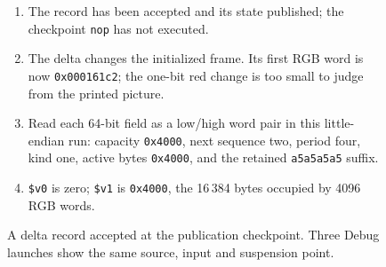 \begin{figure}[htbp]
  \par\smallskip
  \begin{minipage}{\linewidth}
    \small
    \begin{enumerate}
      \item The record has been accepted and its state published; the checkpoint \texttt{nop} has not executed.
      \item The delta changes the initialized frame. Its first RGB word is now \texttt{0x000161c2}; the one-bit red change is too small to judge from the printed picture.
      \item Read each 64-bit field as a low/high word pair in this little-endian run: capacity \texttt{0x4000}, next sequence two, period four, kind one, active bytes \texttt{0x4000}, and the retained \texttt{a5a5a5a5} suffix.
      \item \texttt{\$v0} is zero; \texttt{\$v1} is \texttt{0x4000}, the 16\,384 bytes occupied by 4096 RGB words.
    \end{enumerate}
  \end{minipage}
  \caption{A delta record accepted at the publication checkpoint. Three Debug launches show the same source, input and suspension point.}
  \label{fig:video-record-publication}
\end{figure}
